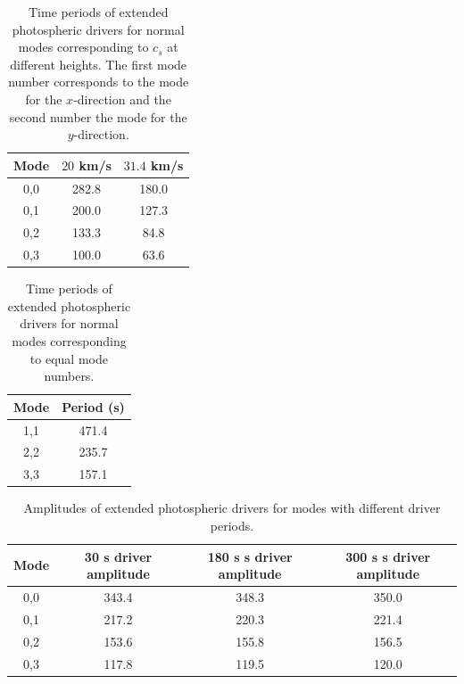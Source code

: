 \documentclass[preprint,authoryear,12pt]{elsarticle}
\begin{document}
\begin{table}
\centering
\begin{tabular}{c c c }
\hline
Mode &  $20$ km/s &  $
31.4$ km/s \\
\hline
0,0  & 282.8 & 180.0 \\
\hline
0,1  & 200.0 & 127.3  \\
\hline
0,2  & 133.3 & 84.8  \\
\hline
0,3  & 100.0 & 63.6  \\
\hline
\end{tabular} 
\caption{Time periods of extended photospheric drivers for normal modes corresponding to $c_s$ at different heights. The first mode number corresponds to the mode for the $x$-direction and the second number the mode for the $y$-direction.}
\label{Table2}
\end{table}

\begin{table}\label{simcperiods}
\centering
\begin{tabular}{c c }
\hline
Mode   &  Period (s) \\
\hline
1,1 & 471.4  \\
\hline
2,2 & 235.7   \\
\hline
3,3 & 157.1   \\
\hline

\end{tabular} 
\caption{Time periods of extended photospheric drivers for normal modes corresponding to equal mode numbers.}
\label{Tableamps_equalmodenumber}
\end{table}

\begin{table}\label{simamps}
\centering
\begin{tabular}{c c c c }
\hline
Mode   & 30 s driver amplitude & 180 s s driver amplitude & 300 s s driver amplitude\\
\hline
0,0 & 343.4 & 348.3 & 350.0 \\
\hline
0,1 & 217.2 & 220.3 & 221.4 \\
\hline
0,2 & 153.6 & 155.8 & 156.5 \\
\hline
0,3 & 117.8 & 119.5 & 120.0 \\
\hline
\end{tabular} 
\caption{Amplitudes of extended photospheric drivers for modes with different driver periods.}
\label{Tableamps_30_180_300}
\end{table}
\end{document}
